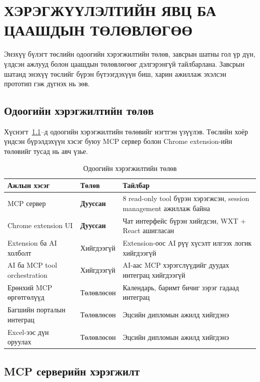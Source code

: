 \chapter{ХЭРЭГЖҮҮЛЭЛТИЙН ЯВЦ БА ЦААШДЫН ТӨЛӨВЛӨГӨӨ}

Энэхүү бүлэгт төслийн одоогийн хэрэгжилтийн төлөв, завсрын шатны гол үр дүн, үлдсэн ажлууд болон цаашдын төлөвлөгөөг дэлгэрэнгүй тайлбарлана. Завсрын шатанд энэхүү төслийг бүрэн бүтээгдэхүүн биш, харин ажиллаж эхэлсэн прототип гэж дүгнэх нь зөв.

\section{Одоогийн хэрэгжилтийн төлөв}

Хүснэгт~\ref{tab:progress}--д одоогийн хэрэгжилтийн төлөвийг нэгтгэн үзүүлэв. Төслийн хоёр үндсэн бүрэлдэхүүн хэсэг буюу MCP сервер болон Chrome extension-ийн төлөвийг тусад нь авч үзье.

\begin{table}[H]
  \centering
  \caption{Одоогийн хэрэгжилтийн төлөв}
  \label{tab:progress}
  \begin{tabularx}{\textwidth}{>{\raggedright\arraybackslash}p{4.6cm} >{\raggedright\arraybackslash}p{2.8cm} X}
    \toprule
    Ажлын хэсэг & Төлөв & Тайлбар \\
    \midrule
    MCP сервер & \textbf{Дууссан} & 8 read-only tool бүрэн хэрэгжсэн, session management ажиллаж байна \\
    Chrome extension UI & \textbf{Дууссан} & Чат интерфейс бүрэн хийгдсэн, WXT + React ашигласан \\
    Extension ба AI холболт & Хийгдээгүй & Extension-оос AI рүү хүсэлт илгээх логик хийгдээгүй \\
    AI ба MCP tool orchestration & Хийгдээгүй & AI-аас MCP хэрэгслүүдийг дуудах интеграц хийгдээгүй \\
    Ерөнхий MCP өргөтгөлүүд & Төлөвлөсөн & Календарь, баримт бичиг зэрэг гадаад интеграц \\
    Багшийн порталын интеграц & Төлөвлөсөн & Эцсийн дипломын ажилд хийгдэнэ \\
    Excel-ээс дүн оруулах & Төлөвлөсөн & Эцсийн дипломын ажилд хийгдэнэ \\
    \bottomrule
  \end{tabularx}
\end{table}

\section{MCP серверийн хэрэгжилт}

